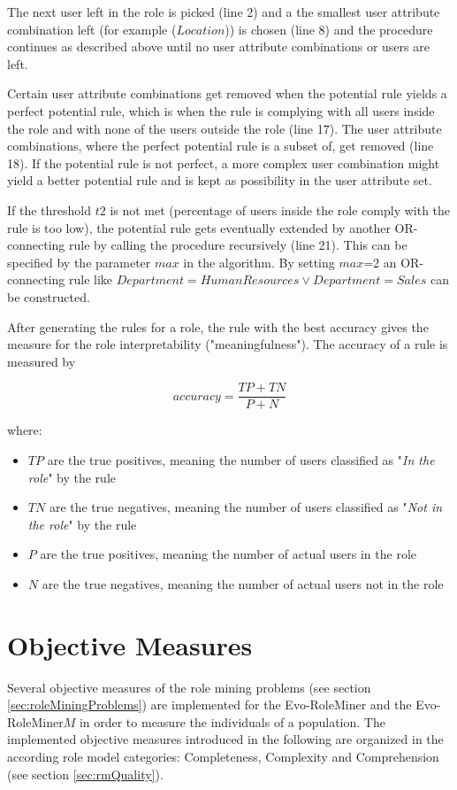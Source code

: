     The next user left in the role is picked (line 2) and a the smallest user attribute combination left (for example ($Location$)) is chosen (line 8) and the procedure continues as described above until no user attribute combinations or users are left.
    
    Certain user attribute combinations get removed when the potential rule yields a perfect potential rule, which is when the rule is complying with all users inside the role and with none of the users outside the role (line 17). The user attribute combinations, where the perfect potential rule is a subset of, get removed (line 18). If the potential rule is not perfect, a more complex user combination might yield a better potential rule and is kept as possibility in the user attribute set.
    
    If the threshold $t2$ is not met (percentage of users inside the role comply with the rule is too low), the potential rule gets eventually extended by another OR-connecting rule by calling the procedure recursively (line 21). This can be specified by the parameter $max$ in the algorithm. By setting $max$=2 an OR-connecting rule like $Department=HumanResources \vee Department=Sales$ can be constructed.
    
    After generating the rules for a role, the rule with the best accuracy gives the measure for the role interpretability ("meaningfulness"). The accuracy of a rule is measured by
    
    \begin{equation}
    accuracy = \frac{TP+TN}{P+N}
    \end{equation}
    
    where:
    
    \begin{itemize}
    	\item $TP$ are the true positives, meaning the number of users classified as "\textit{In the role}" by the rule
    	\item $TN$ are the true negatives, meaning the number of users classified as "\textit{Not in the role}" by the rule
    	\item $P$ are the true positives, meaning the number of actual users in the role
    	\item $N$ are the true negatives, meaning the number of actual users not in the role
    \end{itemize}
        
    \section{Objective Measures}
    \label{sec:objectiveMeasure}
    Several objective measures of the role mining problems (see section \ref{sec:roleMiningProblems}) are implemented for the Evo-RoleMiner and the Evo-RoleMiner$M$ in order to measure the individuals of a population. The implemented objective measures introduced in the following are organized in the according role model categories: Completeness, Complexity and Comprehension (see section \ref{sec:rmQuality}).
    
